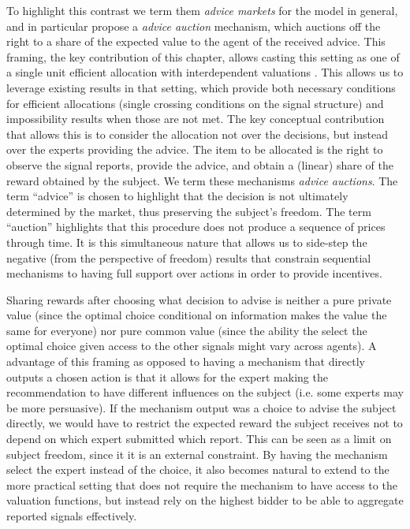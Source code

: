 To highlight this contrast we term them \emph{advice markets} for the model in general, and in particular propose a \emph{advice auction} mechanism, which auctions off the right to a share of the expected value to the agent of the received advice. This framing, the key contribution of this chapter, allows casting this setting as one of a single unit efficient allocation with interdependent valuations \citep{milgrom1982theory,maskin1992auctions,ausubel1999generalized,mclean2004informational,roughgarden2016optimal,eden2018interdependent}.
This allows us to leverage existing results in that setting, which provide both necessary conditions for efficient allocations (single crossing conditions on the signal structure) and impossibility results when those are not met.
The key conceptual contribution that allows this is to consider the allocation not over the decisions, but instead over the experts providing the advice. 
The item to be allocated is the right to observe the signal reports, provide the advice, and obtain a (linear) share of the reward obtained by the subject.
We term these mechanisms \emph{advice auctions}.
The term ``advice'' is chosen to highlight that the decision is not ultimately determined by the market, thus preserving the subject's freedom.
The term ``auction'' highlights that this procedure does not produce a sequence of prices through time.
It is this simultaneous nature that allows us to side-step the negative (from the perspective of freedom) results that constrain sequential mechanisms to having full support over actions in order to provide  incentives.

Sharing rewards after choosing what decision to advise is neither a pure private value (since the optimal choice conditional on information makes the value the same for everyone) nor pure common value (since the ability the select the optimal choice given access to the other signals might vary across agents).
A advantage of this framing as opposed to having a mechanism that directly outputs a chosen action is that it allows for the expert making the recommendation to have different influences on the subject (i.e. some experts may be more persuasive).
If the mechanism output was a choice to advise the subject directly, we would have to restrict the expected reward the subject receives not to depend on which expert submitted which report. This can be seen as  a limit on subject freedom, since it it is an external constraint.
By having the mechanism select the expert instead of the choice, it also becomes natural to extend to the more practical setting that does not require the mechanism to have access to the valuation functions, but instead rely on the highest bidder to be able to aggregate reported signals effectively.

